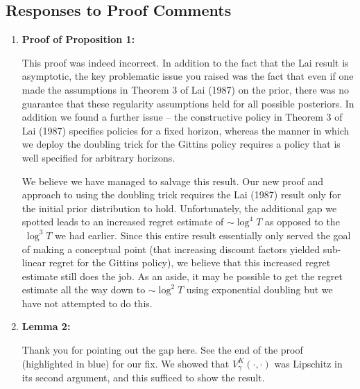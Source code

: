 \documentclass[11pt]{article}
\newcommand{\1}{\ensuremath{\mathbf{1}}} %
\theoremstyle{thm-sf}
\begin{document}
	\subsection{Responses to Proof Comments}
	
	\begin{enumerate}
		\item \textbf {Proof of Proposition 1:} 	
		
		This proof was indeed incorrect. In addition to the fact that the Lai result is asymptotic, the key problematic issue you raised was the fact that even if one made the assumptions in Theorem 3 of Lai (1987) on the prior, there was no guarantee that these regularity assumptions held for all possible posteriors. In addition we found a further issue -- the constructive policy in Theorem 3 of Lai (1987) specifies policies for a fixed horizon, whereas the manner in which we deploy the doubling trick for the Gittins policy requires a policy that is well specified for arbitrary horizons. 
		
		We believe we have managed to salvage this result. Our new proof and approach to using the doubling trick requires the Lai (1987) result only for the initial prior distribution to hold. Unfortunately, the additional gap we spotted leads to an increased regret estimate of $\sim \log^4 T$ as opposed to the $~ \log^3 T$ we had earlier. Since this entire result essentially only served the goal of making a conceptual point (that increasing discount factors yielded sub-linear regret for the Gittins policy), we believe that this increased regret estimate still does the job. As an aside, it may be possible to get the regret estimate all the way down to $\sim \log^2 T$ using exponential doubling but we have not attempted to do this. 
		
		
		\item \textbf {Lemma 2:} 
		
		Thank you for pointing out the gap here. See the end of the proof (highlighted in blue) for our fix. We showed that $V^K_\gamma(\cdot, \cdot)$ was Lipschitz in its second argument, and this sufficed to show the result.
		
	\end{enumerate}
	
\end{document}
